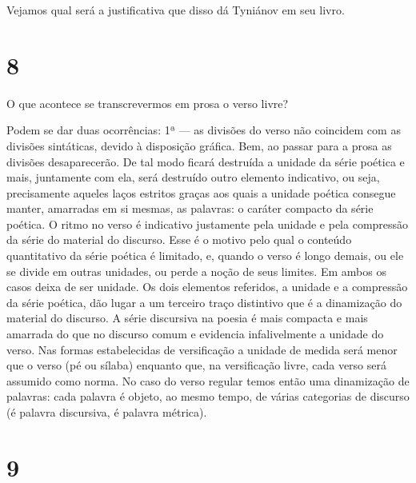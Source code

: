 Vejamos qual será a justificativa que disso dá Tyniánov em seu livro.

\section{8}

O que acontece se transcrevermos em prosa o verso livre?

Podem se dar duas ocorrências: 1ª --- as divisões do verso não coincidem
com as divisões sintáticas, devido à disposição gráfica. Bem, ao passar
para a prosa as divisões desaparecerão. De tal modo ficará destruída a
unidade da série poética e mais, juntamente com ela, será destruído
outro elemento indicativo, ou seja, precisamente aqueles laços estritos
graças aos quais a unidade poética consegue manter, amarradas em si
mesmas, as palavras: o caráter compacto da série poética. O ritmo no
verso é indicativo justamente pela unidade e pela compressão da série
do material do discurso. Esse é o motivo pelo qual o conteúdo
quantitativo da série poética é limitado, e, quando o verso é longo
demais, ou ele se divide em outras unidades, ou perde a noção de seus
limites. Em ambos os casos deixa de ser unidade. Os dois elementos
referidos, a unidade e a compressão da série poética, dão lugar a um
terceiro traço distintivo que é a dinamização do material do discurso. A
série discursiva na poesia é mais compacta e mais amarrada do que no
discurso comum e evidencia infalivelmente a unidade do verso. Nas formas
estabelecidas de versificação a unidade de medida será menor que o verso
(pé ou sílaba) enquanto que, na versificação livre, cada verso será
assumido como norma. No caso do verso regular temos então uma
dinamização de palavras: cada palavra é objeto, ao mesmo tempo, de
várias categorias de discurso (é palavra discursiva, é palavra métrica).

\section{9}

